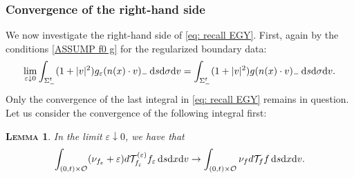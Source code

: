 \documentclass[10pt, reqno]{amsart}
\theoremstyle{plain}
\newtheorem{lemma}[theorem]{\normalfont \scshape Lemma}
\theoremstyle{definition}
\theoremstyle{remark}
\numberwithin{equation}{section}
\newcommand{\calO}{\mathcal O}
\newcommand{\calT}{\mathcal T}
\newcommand{\ve}{\varepsilon}
\newcommand{\dx}{\textnormal{d}x}
\newcommand{\dv}{\textnormal{d}v}
\newcommand{\ds}{\textnormal{d}s}
\newcommand{\tnd}{\textnormal{d}}
\begin{document}
\subsubsection{Convergence of the right-hand side}
We now investigate the right-hand side of \eqref{eq: recall EGY}. First, again by the conditions \eqref{ASSUMP f0 g} for the regularized boundary data:
\begin{align*}
    \lim_{\ve\downarrow 0} \int_{\Sigma_-^t} (1+|v|^2) g_\ve (n(x)\cdot v)_- \,\ds\tnd\sigma\dv = \int_{\Sigma_-^t} (1+|v|^2) g (n(x)\cdot v)_- \,\ds\tnd\sigma\dv.
\end{align*}
Only the convergence of the last integral in \eqref{eq: recall EGY} remains in question. Let us consider the convergence of the following integral first:
\begin{lemma} 
In the limit $\ve\downarrow 0$, we have that
\begin{align}\label{eq: egy mass}
    \int_{(0,t)\times \calO} (\nu_{f_\ve} + \ve) d \calT_{f_\ve}^{(\ve)} f_\ve \,\ds\dx\dv \to \int_{(0,t)\times \calO} \nu_f d\calT_f f \,\ds\dx\dv.
\end{align}
\end{lemma}
\end{document}
